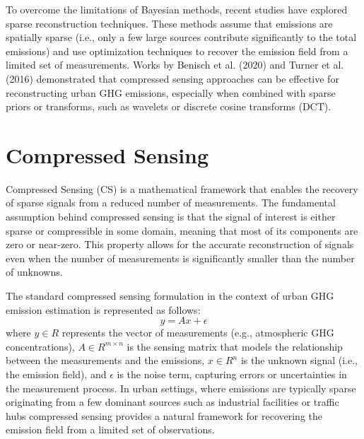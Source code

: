 To overcome the limitations of Bayesian methods, recent studies have explored sparse reconstruction techniques.
These methods assume that emissions are spatially sparse (i.e., only a few large sources contribute significantly to the total emissions) and use optimization techniques to recover the emission field from a limited set of measurements.
Works by Benisch et al. (2020) and Turner et al. (2016) demonstrated that compressed sensing approaches can be effective for reconstructing urban GHG emissions, especially when combined with sparse priors or transforms, such as wavelets or discrete cosine transforms (DCT).



\section{Compressed Sensing}
Compressed Sensing (CS) is a mathematical framework that enables the recovery of sparse signals from a reduced number of measurements.
The fundamental assumption behind compressed sensing is that the signal of interest is either sparse or compressible in some domain, meaning that most of its components are zero or near-zero.
This property allows for the accurate reconstruction of signals even when the number of measurements is significantly smaller than the number of unknowns.

The standard compressed sensing formulation in the context of urban GHG emission estimation is represented as follows:
\begin{equation}
    y = A x + \epsilon
\end{equation}
where $y \in R$ represents the vector of measurements (e.g., atmospheric GHG concentrations), $A \in R^{m \times n}$ is the sensing matrix that models the relationship between the measurements and the emissions, $x \in R^n$ is the unknown signal (i.e., the emission field), and $\epsilon$ is the noise term, capturing errors or uncertainties in the measurement process.
In urban settings, where emissions are typically sparse originating from a few dominant sources such as industrial facilities or traffic hubs compressed sensing provides a natural framework for recovering the emission field from a limited set of observations.


